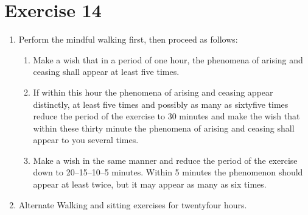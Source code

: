 \documentclass[a5paper,10pt,english]{book}
\begin{document}
\section{Exercise 14}
\label{\detokenize{practice:exercise-14}}\begin{enumerate}
%
\item {} 
\sphinxAtStartPar
Perform the mindful walking first, then proceed as follows:
\begin{enumerate}
%
\item {} 
\sphinxAtStartPar
Make a wish that in a period of one hour, the phenomena of arising and ceasing shall appear at least five times.

\item {} 
\sphinxAtStartPar
If within this hour the phenomena of arising and ceasing appear distinctly, at least five times and possibly as many as sixty\sphinxhyphen{}five times reduce the period of the exercise to 30 minutes and make the wish that within these thirty minute the phenomena of arising and ceasing shall appear to you several times.

\item {} 
\sphinxAtStartPar
Make a wish in the same manner and reduce the period of the exercise down to 20–15–10–5 minutes. Within 5 minutes the phenomenon should appear at least twice, but it may appear as many as six times.

\end{enumerate}

\item {} 
\sphinxAtStartPar
Alternate Walking and sitting exercises for twenty\sphinxhyphen{}four hours.

\end{enumerate}
\end{document}

